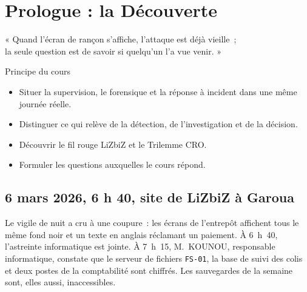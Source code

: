 
\chapter{Prologue : la Découverte}
\label{chap:prologue}

\epigraph{%
    « Quand l'écran de rançon s'affiche, l'attaque est déjà vieille~;\\
    la seule question est de savoir si quelqu'un l'a vue venir. »%
}{Principe du cours}


\begin{boxobjectifs}
\begin{itemize}
    \item Situer la supervision, le forensique et la réponse à incident dans
          une même journée réelle.
    \item Distinguer ce qui relève de la détection, de l'investigation et de
          la décision.
    \item Découvrir le fil rouge LiZbiZ et le Trilemme CRO.
    \item Formuler les questions auxquelles le cours répond.
\end{itemize}
\end{boxobjectifs}

\bigskip

\section*{6 mars 2026, 6 h 40, site de LiZbiZ à Garoua}

Le vigile de nuit a cru à une coupure~: les écrans de l'entrepôt affichent
tous le même fond noir et un texte en anglais réclamant un paiement. À
6~h~40, l'astreinte informatique est jointe. À 7~h~15, M.~KOUNOU, responsable
informatique, constate que le serveur de fichiers \texttt{FS-01}, la base de
suivi des colis et deux postes de la comptabilité sont chiffrés. Les
sauvegardes de la semaine sont, elles aussi, inaccessibles.

